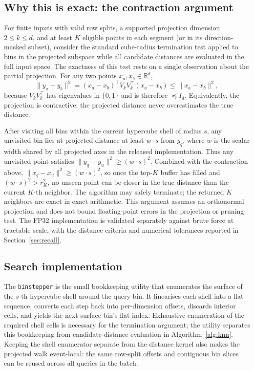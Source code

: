 \documentclass[final,3p,11pt]{elsarticle}
\begin{document}
\subsection{Why this is exact: the contraction argument}
\label{sec:exactness}

For finite inputs with valid row splits, a supported projection dimension
$2 \le k \le d$, and at least $K$ eligible points in each segment (or in
its direction-masked subset), consider the standard cube-radius termination
test applied to bins in the projected subspace while all candidate distances
are evaluated in the full input space. The
exactness of this test rests on a single observation about the partial
projection. For any two points $x_a, x_b \in \mathbb{R}^d$,
\[
  \|y_a - y_b\|^2
  = (x_a - x_b)^\top V_k V_k^\top (x_a - x_b)
  \le \|x_a - x_b\|^2,
\]
because $V_k V_k^\top$ has eigenvalues in $\{0,1\}$ and is therefore
$\preceq I_d$. Equivalently, the projection is contractive: the
projected distance never overestimates the true distance.

After visiting all bins within the current hypercube shell of radius
$s$, any unvisited bin lies at projected distance at least
$w \cdot s$ from $y_q$, where $w$ is the scalar width shared by all
projected axes in the released implementation. Thus any unvisited point
satisfies $\|y_q - y_u\|^2 \ge (w \cdot s)^2$. Combined with the
contraction above, $\|x_q - x_u\|^2 \ge (w \cdot s)^2$, so
once the top-$K$ buffer has filled and $(w \cdot s)^2 > r_K^2$, no unseen
point can be closer in the true distance than the current $K$-th
neighbor. The algorithm may safely terminate; the returned $K$
neighbors are exact in exact arithmetic. This argument assumes an
orthonormal projection and does not bound floating-point errors in the
projection or pruning test. The FP32 implementation is validated separately
against brute force at tractable scale, with the distance criteria and
numerical tolerances reported in Section~\ref{sec:recall}.

\subsection{Search implementation}

The \texttt{binstepper} is the small bookkeeping utility that
enumerates the surface of the $s$-th hypercube shell around the
query bin. It linearises each shell into a flat sequence, converts
each step back into per-dimension offsets, discards interior cells,
and yields the next surface bin's flat index. Exhaustive enumeration
of the required shell cells is necessary for the termination argument;
the utility separates this bookkeeping from candidate-distance
evaluation in Algorithm~\ref{alg:knn}. Keeping the shell enumerator
separate from the distance kernel also makes the projected walk
event-local: the same row-split offsets and contiguous bin slices can
be reused across all queries in the batch.
\end{document}
